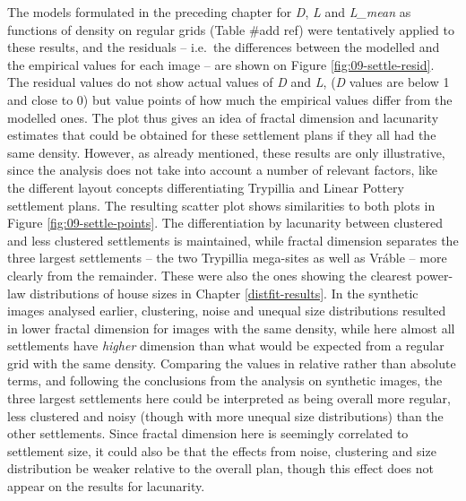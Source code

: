 \documentclass[
  12pt,
]{book}
\begin{document}
The models formulated in the preceding chapter for \emph{D}, \emph{L} and \emph{L\_mean} as functions of density on regular grids (Table \#add ref) were tentatively applied to these results, and the residuals -- i.e.~the differences between the modelled and the empirical values for each image -- are shown on Figure \ref{fig:09-settle-resid}. The residual values do not show actual values of \emph{D} and \emph{L}, (\emph{D} values are below 1 and close to 0) but value points of how much the empirical values differ from the modelled ones. The plot thus gives an idea of fractal dimension and lacunarity estimates that could be obtained for these settlement plans if they all had the same density. However, as already mentioned, these results are only illustrative, since the analysis does not take into account a number of relevant factors, like the different layout concepts differentiating Trypillia and Linear Pottery settlement plans. The resulting scatter plot shows similarities to both plots in Figure \ref{fig:09-settle-points}. The differentiation by lacunarity between clustered and less clustered settlements is maintained, while fractal dimension separates the three largest settlements -- the two Trypillia mega-sites as well as Vráble -- more clearly from the remainder. These were also the ones showing the clearest power-law distributions of house sizes in Chapter \ref{distfit-results}. In the synthetic images analysed earlier, clustering, noise and unequal size distributions resulted in lower fractal dimension for images with the same density, while here almost all settlements have \emph{higher} dimension than what would be expected from a regular grid with the same density. Comparing the values in relative rather than absolute terms, and following the conclusions from the analysis on synthetic images, the three largest settlements here could be interpreted as being overall more regular, less clustered and noisy (though with more unequal size distributions) than the other settlements. Since fractal dimension here is seemingly correlated to settlement size, it could also be that the effects from noise, clustering and size distribution be weaker relative to the overall plan, though this effect does not appear on the results for lacunarity.
\end{document}
